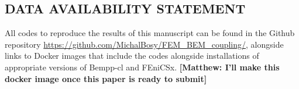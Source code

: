 \documentclass[12pt]{article}
\newcommand{\mscomment}[1]{\textbf{\color{red}[Matthew: #1]}}
\begin{document}
\subsection*{\sffamily \large DATA AVAILABILITY STATEMENT}
All codes to reproduce the results of this manuscript can be found in the Github repository \url{https://github.com/MichalBosy/FEM_BEM_coupling/}, alongside links to Docker images
that include the codes alongside installations of appropriate versions of Bempp-cl and FEniCSx. \mscomment{I'll make this docker image once this paper is ready to submit}


\clearpage



%
%


\end{document}

